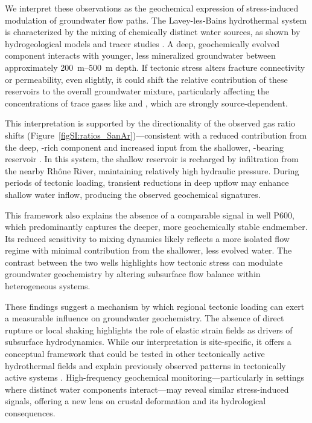 We interpret these observations as the geochemical expression of stress-induced modulation of groundwater flow paths.
The Lavey-les-Bains hydrothermal system is characterized by the mixing of chemically distinct water sources, as shown by hydrogeological models and tracer studies \citep{sonney2009numerical, giroud2025microbio}.
A deep, geochemically evolved component interacts with younger, less mineralized groundwater between approximately \SIrange{200}{500}{\metre} depth.
If tectonic stress alters fracture connectivity or permeability, even slightly, it could shift the relative contribution of these reservoirs to the overall groundwater mixture, particularly affecting the concentrations of trace gases like  and , which are strongly source-dependent.

This interpretation is supported by the directionality of the observed gas ratio shifts (Figure~\ref{figSI:ratios_SanAr})---consistent with a reduced contribution from the deep, -rich component and increased input from the shallower, -bearing reservoir \citep{giroud2025microbio}.
In this system, the shallow reservoir is recharged by infiltration from the nearby Rhône River, maintaining relatively high hydraulic pressure.
During periods of tectonic loading, transient reductions in deep upflow may enhance shallow water inflow, producing the observed geochemical signatures.

This framework also explains the absence of a comparable signal in well P600, which predominantly captures the deeper, more geochemically stable endmember.
Its reduced sensitivity to mixing dynamics likely reflects a more isolated flow regime with minimal contribution from the shallower, less evolved water.
The contrast between the two wells highlights how tectonic stress can modulate groundwater geochemistry by altering subsurface flow balance within heterogeneous systems.

These findings suggest a mechanism by which regional tectonic loading can exert a measurable influence on groundwater geochemistry.
The absence of direct rupture or local shaking highlights the role of elastic strain fields as drivers of subsurface hydrodynamics.
While our interpretation is site-specific, it offers a conceptual framework that could be tested in other tectonically active hydrothermal fields and explain previously observed patterns in tectonically active systems \citep{schilling2023revisiting}.
High-frequency geochemical monitoring---particularly in settings where distinct water components interact---may reveal similar stress-induced signals, offering a new lens on crustal deformation and its hydrological consequences.

